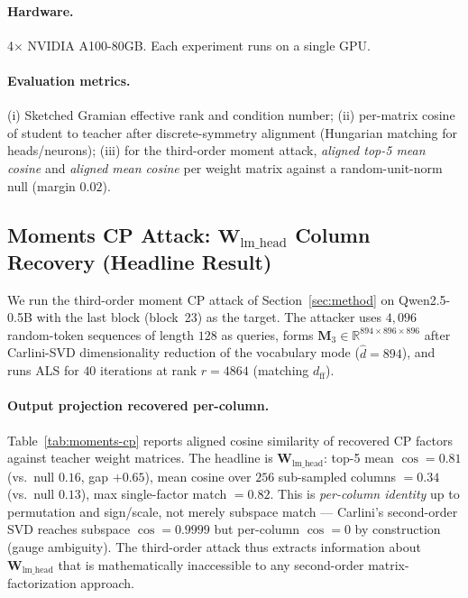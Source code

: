 \documentclass{article}
\newcommand{\R}{\mathbb{R}}
\newcommand{\bW}{\mathbf{W}}
\newcommand{\bM}{\mathbf{M}}
\begin{document}
\paragraph{Hardware.} 4$\times$ NVIDIA A100-80GB. Each experiment runs on a single GPU.

\paragraph{Evaluation metrics.} (i) Sketched Gramian effective rank and condition number; (ii) per-matrix cosine of student to teacher after discrete-symmetry alignment (Hungarian matching for heads/neurons); (iii) for the third-order moment attack, \emph{aligned top-5 mean cosine} and \emph{aligned mean cosine} per weight matrix against a random-unit-norm null (margin $0.02$).

\subsection{Moments CP Attack: $\bW_{\text{lm\_head}}$ Column Recovery (Headline Result)}
\label{sec:exp-moments}

We run the third-order moment CP attack of Section~\ref{sec:method} on Qwen2.5-0.5B with the last block (block~23) as the target. The attacker uses $4{,}096$ random-token sequences of length $128$ as queries, forms $\bM_3 \in \R^{894 \times 896 \times 896}$ after Carlini-SVD dimensionality reduction of the vocabulary mode ($\hat{d} = 894$), and runs ALS for $40$ iterations at rank $r = 4864$ (matching $d_\text{ff}$).

\paragraph{Output projection recovered per-column.} Table~\ref{tab:moments-cp} reports aligned cosine similarity of recovered CP factors against teacher weight matrices. The headline is $\bW_{\text{lm\_head}}$: top-5 mean $\cos = 0.81$ (vs.\ null $0.16$, gap $+0.65$), mean cosine over $256$ sub-sampled columns $= 0.34$ (vs.\ null $0.13$), max single-factor match $= 0.82$. This is \emph{per-column identity} up to permutation and sign/scale, not merely subspace match --- Carlini's second-order SVD reaches subspace $\cos = 0.9999$ but per-column $\cos = 0$ by construction (gauge ambiguity). The third-order attack thus extracts information about $\bW_{\text{lm\_head}}$ that is mathematically inaccessible to any second-order matrix-factorization approach.
\end{document}

